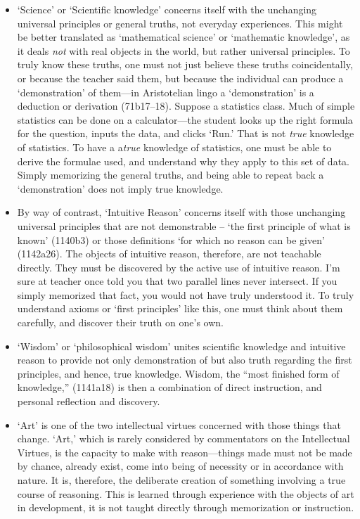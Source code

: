 \begin{itemize}
\item `Science' or `Scientific knowledge' concerns itself with the unchanging universal principles or general truths, not everyday experiences. This might be better translated as `mathematical science' or `mathematic knowledge', as it deals \emph{not} with real objects in the world, but rather universal principles. To truly know these truths, one must not just believe these truths coincidentally, or because the teacher said them, but because the individual can produce a `demonstration' of them---in Aristotelian lingo a `demonstration' is a deduction or derivation (71b17--18). Suppose a statistics class. Much of simple statistics can be done on a calculator---the student looks up the right formula for the question, inputs the data, and clicks `Run.' That is not \emph{true} knowledge of statistics. To have a a\emph{true} knowledge of statistics, one must be able to derive the formulae used, and understand why they apply to this set of data. Simply memorizing the general truths, and being able to repeat back a `demonstration' does not imply true knowledge. 

\item By way of contrast, `Intuitive Reason' concerns itself with those unchanging universal principles that are not demonstrable – `the first principle of what is known' (1140b3) or those definitions `for which no reason can be given' (1142a26). The objects of intuitive reason, therefore, are not teachable directly. They must be discovered by the active use of intuitive reason. I'm sure at teacher once told you that two parallel lines never intersect. If you simply memorized that fact, you would not have truly understood it. To truly understand axioms or `first principles' like this, one must think about them carefully, and discover their truth on one's own.

\item `Wisdom' or `philosophical wisdom' unites scientific knowledge and intuitive reason to provide not only demonstration of but also truth regarding the first principles, and hence, true knowledge. Wisdom, the ``most finished form of knowledge,'' (1141a18) is then a combination of direct instruction, and personal reflection and discovery.

\item `Art' is one of the two intellectual virtues concerned with those things that change. `Art,' which is rarely considered by commentators on the Intellectual Virtues, is the capacity to make with reason---things made must not be made by chance, already exist, come into being of necessity or in accordance with nature. It is, therefore, the deliberate creation of something involving a true course of reasoning. This is learned through experience with the objects of art in development, it is not taught directly through memorization or instruction. 


\end{itemize}

